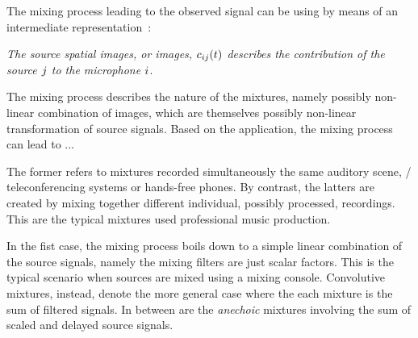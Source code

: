 The mixing process leading to the observed signal can be using by means of an intermediate representation~\cite{sturmel2012linear}:
\begin{center}
    \textit{The \emph{source spatial images}, or \emph{images},  $c_{ij}(t)$ describes the
    contribution
    of the source $j$ to the microphone $i$}.
\end{center}

The mixing process describes the nature of the mixtures, namely possibly non-linear combination of images, which are themselves possibly non-linear transformation of source signals.
Based on the application, the mixing process can lead to ...

The former refers to mixtures recorded simultaneously the same auditory scene, \eg/ teleconferencing systems or hands-free phones.
By contrast, the latters are created by mixing together different individual, possibly processed, recordings.
This are the typical mixtures used professional music production.

In the fist case, the mixing process boils down to a simple linear combination of the source signals, namely
the mixing filters are just scalar factors.
This is the typical scenario when sources are mixed using a mixing console.
Convolutive mixtures, instead, denote the more general case where the each mixture is the sum of filtered signals.
In between are the \textit{anechoic} mixtures involving the sum of scaled and delayed source signals.

